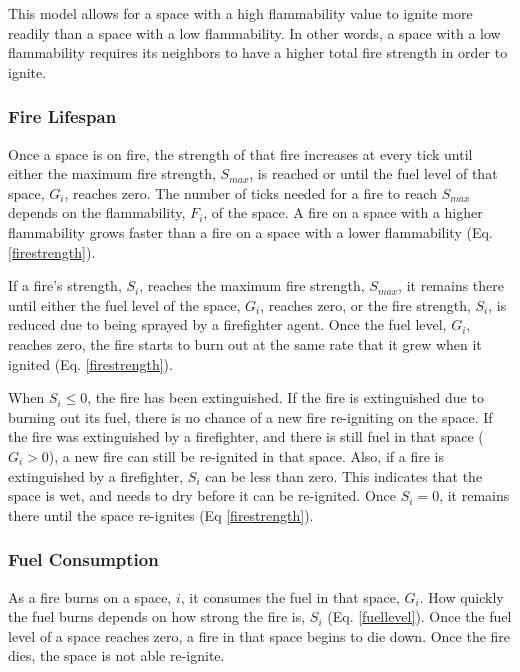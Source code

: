 \documentclass{article}
\begin{document}
  This model allows for a space with a high flammability value to
  ignite more readily than a space with a low flammability.  In other words,
  a space with a low flammability requires its neighbors to have a higher
  total fire strength in order to ignite.

  \subsubsection*{Fire Lifespan}

  Once a space is on fire, the strength of that fire increases at every tick
  until either the maximum fire strength, $S_{max}$, is reached or until the
  fuel level of that space, $G_i$, reaches zero.  The number of ticks needed
  for a fire to reach $S_{max}$ depends on the flammability, $F_i$, of the
  space.  A fire on a space with a higher flammability grows faster than a
  fire on a space with a lower flammability (Eq. \ref{firestrength}).

  If a fire's strength, $S_i$, reaches the maximum fire strength, $S_{max}$, it
  remains there until either the fuel level of the space, $G_i$, reaches zero,
  or the fire strength, $S_i$, is reduced due to being sprayed by a
  firefighter agent.  Once the fuel level, $G_i$, reaches zero, the fire starts
  to burn out at the same rate that it grew when it ignited
  (Eq. \ref{firestrength}).

  When $S_i \leq 0$, the fire has been extinguished.  If the fire is
  extinguished due to burning out its fuel, there is no chance of a new fire
  re-igniting on the space.  If the fire was extinguished by a firefighter,
  and there is still fuel in that space ($G_i > 0$), a new fire can still be
  re-ignited in that space.  Also, if a fire is extinguished by a firefighter,
  $S_i$ can be less than zero.  This indicates that the space is wet, and needs
  to dry before it can be re-ignited. Once $S_i = 0$, it remains there until the
  space re-ignites (Eq \ref{firestrength}).

  \subsubsection*{Fuel Consumption}

  As a fire burns on a space, $i$, it consumes the fuel in that space, $G_i$.
  How quickly the fuel burns depends on how strong the fire is, $S_i$
  (Eq. \ref{fuellevel}).  Once the fuel level of a space reaches zero, a fire
  in that space begins to die down.  Once the fire dies, the space is not able
  re-ignite.
\end{document}

